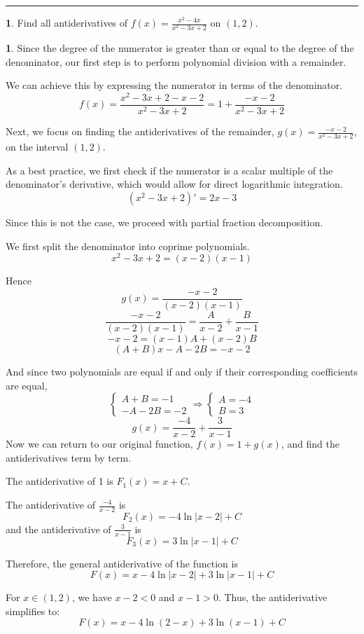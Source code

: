 \documentclass[english]{article}
\theoremstyle{plain}
\theoremstyle{definition}
\newtheorem{problem}[thm]{\protect\problemname}
\theoremstyle{definition}
\newtheorem*{sol*}{\protect\solutionname}
\providecommand{\problemname}{Problem}
\providecommand{\solutionname}{Solution}
\begin{document}
\rule[0.5ex]{1\columnwidth}{1pt}

\medskip{}

\newpage{}
\begin{problem}
Find all antiderivatives of $f(x)=\frac{x^{2}-4x}{x^{2}-3x+2}$ on
$\left(1,2\right)$.
\end{problem}

\begin{sol*}
Since the degree of the numerator is greater than or equal to the
degree of the denominator, our first step is to perform polynomial
division with a remainder.

We can achieve this by expressing the numerator in terms of the denominator.
\[
f(x)=\frac{x^{2}-3x+2-x-2}{x^{2}-3x+2}=1+\frac{-x-2}{x^{2}-3x+2}
\]

Next, we focus on finding the antiderivatives of the remainder, $g(x)=\frac{-x-2}{x^{2}-3x+2}$,
on the interval $(1,2)$.

As a best practice, we first check if the numerator is a scalar multiple
of the denominator's derivative, which would allow for direct logarithmic
integration.
\[
\left(x^{2}-3x+2\right)'=2x-3
\]

Since this is not the case, we proceed with partial fraction decomposition. 

We first split the denominator into coprime polynomials. 
\[
x^{2}-3x+2=\left(x-2\right)\left(x-1\right)
\]

Hence
\[
g(x)=\frac{-x-2}{\left(x-2\right)\left(x-1\right)}
\]
\[
\frac{-x-2}{\left(x-2\right)\left(x-1\right)}=\frac{A}{x-2}+\frac{B}{x-1}
\]
\[
-x-2=\left(x-1\right)A+\left(x-2\right)B
\]
\[
\left(A+B\right)x-A-2B=-x-2
\]

And since two polynomials are equal if and only if their corresponding
coefficients are equal,
\[
\begin{cases}
A+B=-1\\
-A-2B=-2
\end{cases}\Rightarrow\begin{cases}
A=-4\\
B=3
\end{cases}
\]
\[
g(x)=\frac{-4}{x-2}+\frac{3}{x-1}
\]
Now we can return to our original function, $f(x)=1+g(x)$, and find
the antiderivatives term by term.

The antiderivative of 1 is $F_{1}(x)=x+C$. 

The antiderivative of $\frac{-4}{x-2}$ is 
\[
F_{2}(x)=-4\ln\left|x-2\right|+C
\]
 and the antiderivative of $\frac{3}{x-1}$ is 
\[
F_{3}(x)=3\ln\left|x-1\right|+C
\]

Therefore, the general antiderivative of the function is 
\[
F(x)=x-4\ln\left|x-2\right|+3\ln\left|x-1\right|+C
\]

For $x\in(1,2)$, we have $x-2<0$ and $x-1>0$. Thus, the antiderivative
simplifies to:
\[
F(x)=x-4\ln\left(2-x\right)+3\ln\left(x-1\right)+C
\]
\end{sol*}
\end{document}
